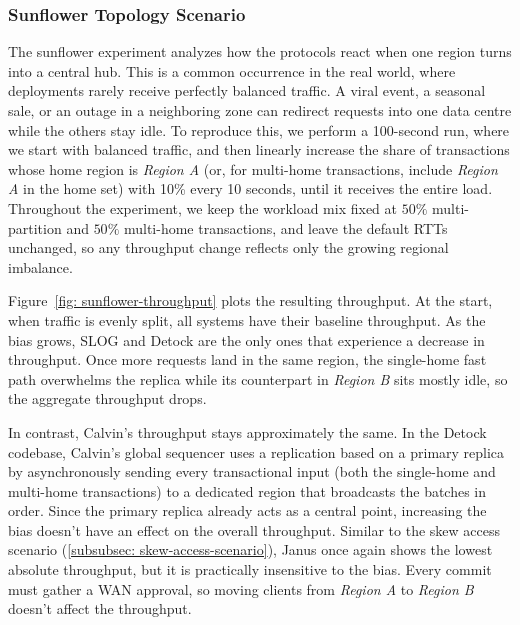 \documentclass{article}
\begin{document}
\subsubsection{Sunflower Topology Scenario}
\label{subsubsec: sunflower-topology-scenario}
The sunflower experiment analyzes how the protocols react when one region turns into a central hub. This is a common occurrence in the real world, where deployments rarely receive perfectly balanced traffic. A viral event, a seasonal sale, or an outage in a neighboring zone can redirect requests into one data centre while the others stay idle. To reproduce this, we perform a 100-second run, where we start with balanced traffic, and then linearly increase the share of transactions whose home region is \textit{Region A} (or, for multi-home transactions, include \textit{Region A} in the home set) with 10\% every 10 seconds, until it receives the entire load. Throughout the experiment, we keep the workload mix fixed at $50\%$ multi-partition and $50\%$ multi-home transactions, and leave the default RTTs unchanged, so any throughput change reflects only the growing regional imbalance.

Figure~\ref{fig: sunflower-throughput} plots the resulting throughput. At the start, when traffic is evenly split, all systems have their baseline throughput. As the bias grows, SLOG and Detock are the only ones that experience a decrease in throughput. Once more requests land in the same region, the single-home fast path overwhelms the replica while its counterpart in \textit{Region B} sits mostly idle, so the aggregate throughput drops.

In contrast, Calvin's throughput stays approximately the same. In the Detock codebase, Calvin's global sequencer uses a replication based on a primary replica by asynchronously sending every transactional input (both the single-home and multi-home transactions) to a dedicated region that broadcasts the batches in order. Since the primary replica already acts as a central point, increasing the bias doesn't have an effect on the overall throughput. Similar to the skew access scenario (\ref{subsubsec: skew-access-scenario}), Janus once again shows the lowest absolute throughput, but it is practically insensitive to the bias. Every commit must gather a WAN approval, so moving clients from \textit{Region A} to \textit{Region B} doesn't affect the throughput.
\end{document}
